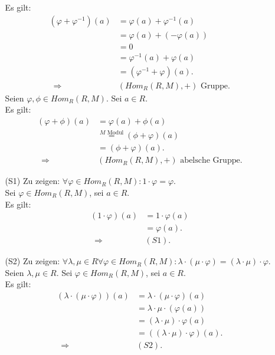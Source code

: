 \documentclass[12pt]{article}
\newcommand{\df}{\enspace\Longrightarrow\enspace}
\newcommand{\homr}{Hom_R(R,M)}
\begin{document}
\begin{enumerate}
\begin{enumerate}
		Es gilt:
		\begin{align*}
			(\varphi+\varphi^{-1})(a)&=\varphi(a)+\varphi^{-1}(a) \\
			&=\varphi(a)+(-\varphi(a)) \\
			&=0 \\
			&=\varphi^{-1}(a)+\varphi(a) \\
			&=(\varphi^{-1}+\varphi)(a). \\
			\df&(\homr,+)\text{ Gruppe}.
		\end{align*}
		Seien $\varphi,\phi\in\homr$. Sei $a\in R$. \\
		Es gilt:
		\begin{align*}
			(\varphi+\phi)(a)&=\varphi(a)+\phi(a) \\
			&\overset{M\text{ Modul}}{=}(\phi+\varphi)(a) \\
			&=(\phi+\varphi)(a). \\
			\df&(\homr,+)\text{ abelsche Gruppe}.
		\end{align*}
		
		\item[(S1)] Zu zeigen: $\forall\varphi\in\homr:1\cdot\varphi=\varphi$. \\
		Sei $\varphi\in\homr$, sei $a\in R$. \\
		Es gilt:
		\begin{align*}
			(1\cdot\varphi)(a)&=1\cdot\varphi(a) \\
			&=\varphi(a). \\
			\df&(S1).
		\end{align*}
		
		\item[(S2)] Zu zeigen: $\forall\lambda,\mu\in R\forall\varphi\in\homr:\lambda\cdot(\mu\cdot\varphi)=(\lambda\cdot\mu)\cdot\varphi$. \\
		Seien $\lambda,\mu\in R$. Sei $\varphi\in\homr$, sei $a\in R$. \\
		Es gilt:
		\begin{align*}
			(\lambda\cdot(\mu\cdot\varphi))(a)&=\lambda\cdot(\mu\cdot\varphi)(a) \\
			&=\lambda\cdot\mu\cdot(\varphi(a)) \\
			&=(\lambda\cdot\mu)\cdot\varphi(a) \\
			&=((\lambda\cdot\mu)\cdot\varphi)(a). \\
			\df&(S2).
		\end{align*}
		

\end{enumerate}
\end{enumerate}
\end{document}
